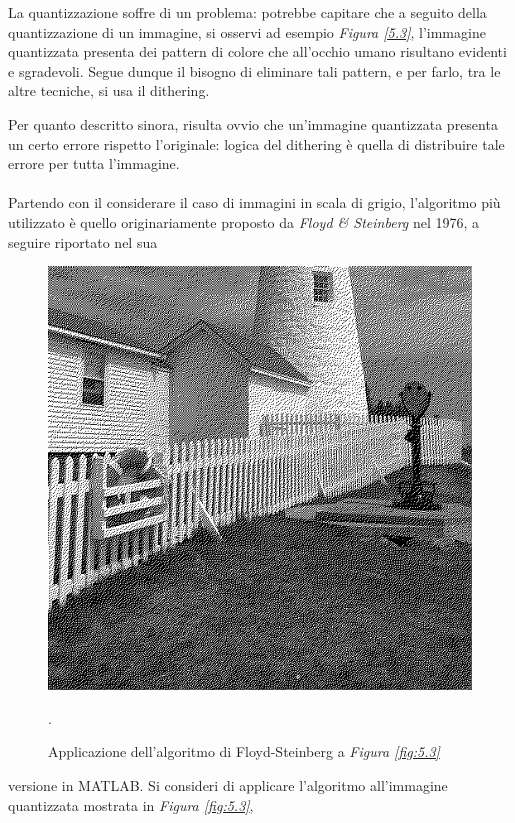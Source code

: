 \documentclass{subfiles}
\begin{document}
La quantizzazione soffre di un problema: potrebbe capitare che a seguito della quantizzazione di un immagine, si osservi ad esempio \emph{Figura \ref{5.3}},
l'immagine quantizzata presenta dei pattern di colore che all'occhio umano risultano evidenti e sgradevoli.
Segue dunque il bisogno di eliminare tali pattern, e per farlo, tra le altre tecniche, si usa il dithering.

Per quanto descritto sinora, risulta ovvio che un'immagine quantizzata presenta un certo errore rispetto l'originale:
logica del dithering è quella di distribuire tale errore per tutta l'immagine.
\\ \\
Partendo con il considerare il caso di immagini in scala di grigio, l'algoritmo più utilizzato è quello originariamente proposto da \emph{Floyd \emph{\&} Steinberg} nel 1976,
a seguire riportato nel sua
\begin{figure}
    \centering
    \includegraphics[scale = 0.325]{../Images/Lighthouse/DitheredLighthouse.png}
    \caption{Applicazione dell'algoritmo di Floyd-Steinberg a \emph{Figura \ref{fig:5.3}}}.
    \label{fig:5.4}
\end{figure}
versione in MATLAB. Si consideri di applicare l'algoritmo all'immagine quantizzata mostrata in \emph{Figura \ref{fig:5.3}},
\end{document}
